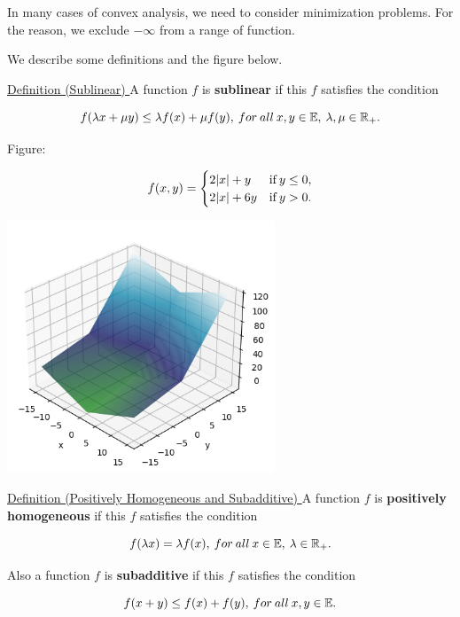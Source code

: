\documentclass[a4paper,11pt]{jsarticle}
\begin{document}
In many cases of convex analysis, we need to
consider minimization problems. For the reason, we exclude $-\infty$ from a range of function.

We describe some definitions and the figure below.

\begin{itembox}[l]{\underline{Definition (Sublinear) }}
  A function $f$ is \textbf{sublinear} if this $f$ satisfies the condition

  \begin{equation}
    f(\lambda x + \mu y) \leq \lambda f(x) + \mu f(y),\:for \:all\: x, y \in{\mathbb{E}},\: \lambda, \mu \in{\mathbb{R}}_+. \notag
  \end{equation}
\end{itembox}

Figure:

\begin{equation}
  f(x, y)=
  \begin{cases}
    2|x| + y & \text{if}\:y \leq 0, \\
    2|x| + 6y & \text{if}\:y > 0. \notag
  \end{cases}
\end{equation}

\begin{center}
  \includegraphics[width=8cm]{figures/sublinear_output.png}
\end{center}

\begin{itembox}[l]{\underline{Definition (Positively Homogeneous and Subadditive) }}
  A function $f$ is \textbf{positively homogeneous} if this $f$ satisfies the condition

  \begin{equation}
    f(\lambda x) = \lambda f(x),\:for \:all\: x \in{\mathbb{E}},\: \lambda \in{\mathbb{R}}_+. \notag
  \end{equation}

  Also a function $f$ is \textbf{subadditive} if this $f$ satisfies the condition

  \begin{equation}
    f( x + y) \leq f(x) + f(y),\:for \:all\: x, y \in{\mathbb{E}}. \notag
  \end{equation}
\end{itembox}
\end{document}
